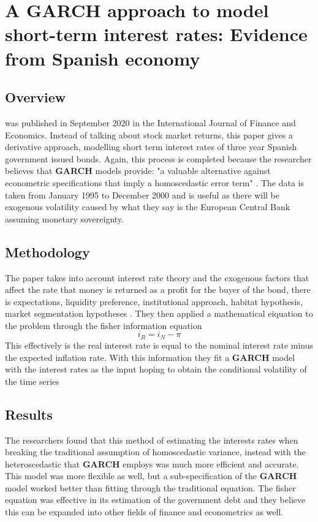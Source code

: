 \section{A GARCH approach to model short-term interest rates: Evidence from Spanish economy}
\subsection{Overview}
\cite{https://doi-org.ezproxy.st-andrews.ac.uk/10.1002/ijfe.2234} was published in September 2020 in the International Journal of Finance and Economics. Instead of talking about stock market returns, this paper gives a derivative approach, modelling short term interest rates of three year Spanish government issued bonds. Again, this process is completed because the researcher believes that \textbf{GARCH} models provide: "a valuable alternative against econometric specifications that imply a homoscedastic error term" \cite{https://doi-org.ezproxy.st-andrews.ac.uk/10.1002/ijfe.2234}. The data is taken from January 1995 to December 2000 and is useful as there will be exogenous volatility caused by what they say is the European Central Bank assuming monetary sovereignty. 
\subsection{Methodology}
The paper takes into account interest rate theory and the exogenous factors that affect the rate that money is returned as a profit for the buyer of the bond, there is expectations, liquidity preference, institutional approach, habitat hypothesis, market segmentation hypotheses \cite{https://doi-org.ezproxy.st-andrews.ac.uk/10.1002/ijfe.2234}. They then applied a mathematical eiquation to the problem through the fisher information equation $$i_R = i_N -\pi$$ This effectively is the real interest rate is equal to the nominal interest rate minus the expected inflation rate. With this information they fit a \textbf{GARCH} model with the interest rates as the input hoping to obtain the conditional volatility of the time series
\subsection{Results}
The researchers found that this method of estimating the interests rates when breaking the traditional assumption of homoscedastic variance, instead with the heteroscedastic that \textbf{GARCH} employs was much more efficient and accurate. This model was more flexible as well, but a sub-specification of the \textbf{GARCH} model worked better than fitting through the traditional equation. The fisher equation was effective in its estimation of the government debt and they believe this can be expanded into other fields of finance and econometrics as well. \cite{https://doi-org.ezproxy.st-andrews.ac.uk/10.1002/ijfe.2234}